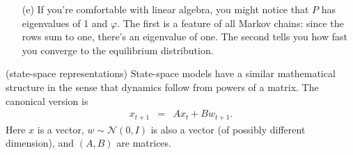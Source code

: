 \documentclass[11pt]{exam}
\begin{document}
\begin{questions}
\begin{solution}
\begin{enumerate}
\item [(e)]
If you're comfortable with linear algebra, you might notice that
$P$ has eigenvalues of 1 and $\varphi$.
The first is a feature of all Markov chains:
since the rows sum to one, there's an eigenvalue of one.
The second tells you how fast you converge to the equilibrium
distribution.

\end{enumerate}
\end{solution}


\question (state-space representations)
State-space models have a similar mathematical structure
in the sense that dynamics follow from powers of a matrix.
The canonical version is
\begin{eqnarray}
    x_{t+1} &=& A x_t + B w_{t+1} .
    \label{eq:state-space}
\end{eqnarray}
Here $x$ is a vector, $w \sim \mathcal{N}(0,I)$
is also a vector (of possibly different dimension),
and $(A,B)$ are matrices.



\end{questions}
\end{document}
